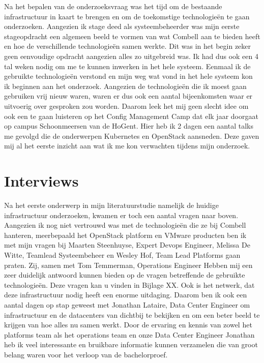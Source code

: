 Na het bepalen van de onderzoeksvraag was het tijd om de bestaande infrastructuur in kaart te brengen en om de toekomstige technologieën te gaan onderzoeken. Aangezien ik stage deed als systeembeheerder was mijn eerste stageopdracht een algemeen beeld te vormen van wat Combell aan te bieden heeft en hoe de verschillende technologieën samen werkte. Dit was in het begin zeker geen eenvoudige opdracht aangezien alles zo uitgebreid was. Ik had dus ook een 4 tal weken nodig om me te kunnen inwerken in het hele systeem. Eenmaal ik de gebruikte technologieën verstond en mijn weg wat vond in het hele systeem kon ik beginnen aan het onderzoek. Aangezien de technologieën die ik moest gaan gebruiken vrij nieuw waren, waren er dus ook een aantal bijeenkomsten waar er uitvoerig over gesproken zou worden. Daarom leek het mij geen slecht idee om ook een te gaan luisteren op het Config Management Camp dat elk jaar doorgaat op campus Schoonmeersen van de HoGent. Hier heb ik 2 dagen een aantal talks me gevolgd die de onderwerpen Kubernetes en OpenStack aansneden. Deze gaven mij al het eerste inzicht aan wat ik me kon verwachten tijdens mijn onderzoek.

\section{Interviews}

Na het eerste onderwerp in mijn literatuurstudie namelijk de huidige infrastructuur onderzoeken, kwamen er toch een aantal vragen naar boven. Aangezien ik nog niet vertrouwd was met de technologieën die ze bij Combell hanteren, meerbepaald het OpenStack platform en VMware producten ben ik met mijn vragen bij Maarten Steenhuyse, Expert Devops Engineer, Melissa De Witte, Teamlead Systeembeheer en Wesley Hof, Team Lead Platforms gaan praten. Zij, samen met Tom Temmerman, Operations Engineer Hebben mij een zeer duidelijk antwoord kunnen bieden op de vragen betreffende de gebruikte technologieën. Deze vragen kan u vinden in Bijlage XX. Ook is het netwerk, dat deze infrastructuur nodig heeft een enorme uitdaging. Daarom ben ik ook een aantal dagen op stap geweest met Jonathan Lataire, Data Center Engineer om infrastructuur en de datacenters van dichtbij te bekijken en om een beter beeld te krijgen van hoe alles nu samen werkt. Door de ervaring en kennis van zowel het platforms team als het operations team en onze Data Center Engineer Jonathan  heb ik veel interessante en bruikbare informatie kunnen verzamelen die van groot belang waren voor het verloop van de bachelorproef.


